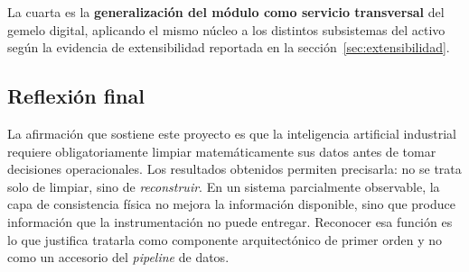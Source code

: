La cuarta es la \textbf{generalización del módulo como servicio transversal} del
gemelo digital, aplicando el mismo núcleo a los distintos subsistemas del activo
según la evidencia de extensibilidad reportada en la
sección~\ref{sec:extensibilidad}.

\subsection{Reflexión final}

La afirmación que sostiene este proyecto es que la inteligencia artificial
industrial requiere obligatoriamente limpiar matemáticamente sus datos antes de
tomar decisiones operacionales. Los resultados obtenidos permiten precisarla:
no se trata solo de limpiar, sino de \emph{reconstruir}. En un sistema
parcialmente observable, la capa de consistencia física no mejora la información
disponible, sino que produce información que la instrumentación no puede
entregar. Reconocer esa función es lo que justifica tratarla como componente
arquitectónico de primer orden y no como un accesorio del \emph{pipeline} de
datos.
